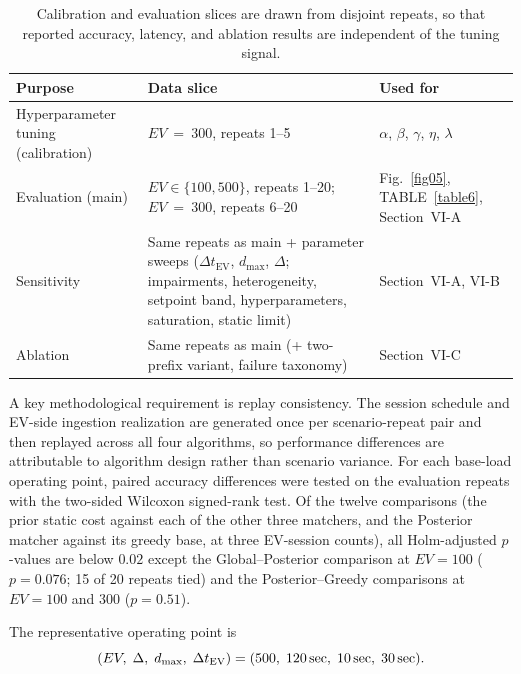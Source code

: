 \documentclass{ieeeaccess}
\newif\ifhighlight \highlightfalse
\DeclareRobustCommand{\revised}[1]{\ifhighlight{\color{blue}#1}\else{\color{.}#1}\fi}
\begin{document}
    \begin{table}[!t]
        \caption{Calibration and evaluation slices are drawn from disjoint repeats, so that reported accuracy, latency, and ablation results are independent of the tuning signal.}
        \label{table:calib_eval}
        \centering
        \begin{tabular}{p{2.0cm} p{2.5cm} p{2.7cm}}
            \toprule
            \textbf{Purpose} & \textbf{Data slice} & \textbf{Used for} \\
            \midrule
            Hyperparameter tuning (calibration) & $EV~=~300$, repeats 1--5 & $\alpha$, $\beta$, $\gamma$, \revised{$\eta$,} $\lambda$ \\
            Evaluation (main) & $EV \in \{100, 500\}$, repeats 1--20; $EV~=~300$, repeats 6--20 & Fig.~\ref{fig05}, TABLE~\ref{table6}, Section~VI-A \\
            Sensitivity & Same repeats as main + parameter sweeps ($\Delta t_{\text{EV}}$, $d_{\max}$, $\Delta$\revised{; impairments, heterogeneity, setpoint band, hyperparameters, saturation, static limit}) & Section~VI-\revised{A, VI-}B \\
            Ablation & Same repeats as main \revised{(+ two-prefix variant, failure taxonomy)} & Section~VI-C \\
            \bottomrule
        \end{tabular}
    \end{table}

    A key methodological requirement is replay consistency.
    The session schedule and EV-side ingestion realization are generated once per scenario-repeat pair and then replayed across all four algorithms, so performance differences are attributable to algorithm design rather than scenario variance.
    \revised{For each base-load operating point, paired accuracy differences were tested on the evaluation repeats with the two-sided Wilcoxon signed-rank test.
    Of the twelve comparisons (the prior static cost against each of the other three matchers, and the Posterior matcher against its greedy base, at three EV-session counts), all Holm-adjusted $p$-values are below $0.02$ except the Global--Posterior comparison at $EV = 100$ ($p = 0.076$; 15 of 20 repeats tied) and the Posterior--Greedy comparisons at $EV = 100$ and $300$ ($p = 0.51$).}

    The representative operating point is
    \begin{equation}\label{eq:e16}
        (EV,\; \Delta,\; d_{\max},\; \Delta t_{\text{EV}}) = (500,\; 120\text{\,\text{sec}},\; 10\text{\,\text{sec}},\; 30\text{\,\text{sec}}).
    \end{equation}
\end{document}
